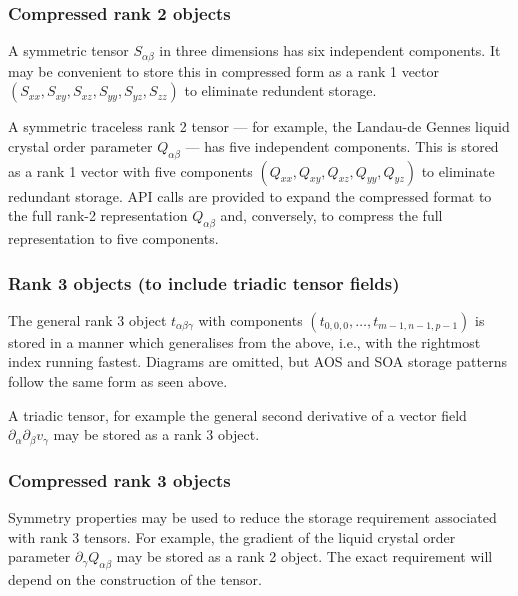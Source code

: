 
\subsubsection{Compressed rank 2 objects}

A symmetric tensor $S_{\alpha\beta}$ in three dimensions has six independent
components. It may be convenient to store this in compressed form as a
rank 1 vector $(S_{xx}, S_{xy}, S_{xz}, S_{yy}, S_{yz}, S_{zz})$ to eliminate
redundent storage.

A symmetric traceless rank 2 tensor --- for example, the Landau-de Gennes
liquid crystal order parameter $Q_{\alpha\beta}$ --- has five independent
components. This is stored as a rank 1 vector with five components
$(Q_{xx}, Q_{xy}, Q_{xz}, Q_{yy}, Q_{yz})$ to eliminate redundant
storage. API calls are provided to expand the compressed format to the
full rank-2 representation $Q_{\alpha\beta}$ and, conversely, to compress
the full representation to five components.

\subsubsection{Rank 3 objects (to include triadic tensor fields)}

The general rank 3 object $t_{\alpha\beta\gamma}$ with components
$(t_{0,0,0}, \ldots, t_{m-1,n-1,p-1})$ is stored in a manner which
generalises from the above, i.e., with the rightmost index running
fastest. Diagrams are omitted, but AOS and SOA storage patterns
follow the same form as seen above.

A triadic tensor, for example the general second derivative of a vector
field $\partial_\alpha \partial_\beta v_\gamma$ may be stored as a rank
3 object.

\subsubsection{Compressed rank 3 objects}

Symmetry properties may be used to reduce the storage requirement
associated with rank 3 tensors. For example, the gradient of the
liquid crystal order parameter $\partial_\gamma Q_{\alpha\beta}$
may be stored as a rank 2 object. The exact requirement will depend
on the construction of the tensor.

%

